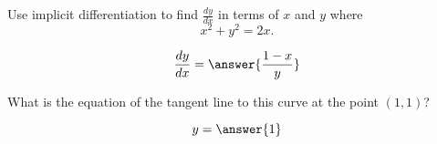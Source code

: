 \documentclass{ximera}
\author{Steven Gubkin}
\begin{document}
\begin{exercise}

Use implicit differentiation to find $\frac{dy}{dx}$ in terms  of $x$ and $y$ where
\[
x^2+y^2 = 2x.
\]
\begin{prompt}
\[
\frac{dy}{dx} = \answer{\frac{1-x}{y}}
\]
\end{prompt}
What is the equation of the tangent line to this curve at the point $(1,1)$?
\begin{prompt}
\[
y = \answer{1}
\]
\end{prompt}
\end{exercise}
\end{document}
